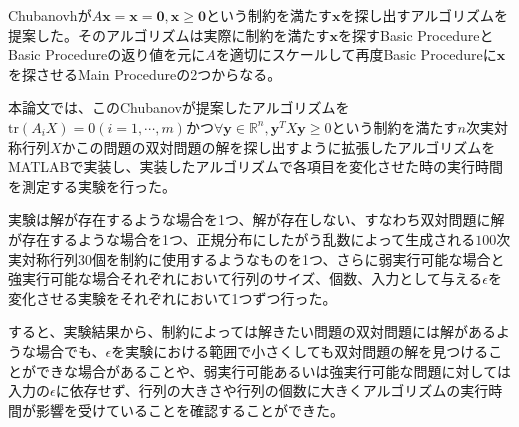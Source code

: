 \begin{概要}
  Chubanovhが$A\mathbf{x} = \mathbf{x} = \mathbf{0}, \mathbf{x} \geq \mathbf{0}$という制約を満たす$\mathbf{x}$を探し出すアルゴリズムを提案した。そのアルゴリズムは実際に制約を満たす$\mathbf{x}$を探すBasic ProcedureとBasic Procedureの返り値を元に$A$を適切にスケールして再度Basic Procedureに$\mathbf{x}$を探させるMain Procedureの2つからなる。

  本論文では、このChubanovが提案したアルゴリズムを$\mathrm{tr} \left(A_i X\right) = 0 \left(i = 1, \cdots, m\right)$かつ$\forall \mathbf{y} \in \mathbb{R}^n, \mathbf{y}^T X \mathbf{y} \geq 0$という制約を満たす$n$次実対称行列$X$かこの問題の双対問題の解を探し出すように拡張したアルゴリズムをMATLABで実装し、実装したアルゴリズムで各項目を変化させた時の実行時間を測定する実験を行った。

  実験は解が存在するような場合を1つ、解が存在しない、すなわち双対問題に解が存在するような場合を1つ、正規分布にしたがう乱数によって生成される$100$次実対称行列$30$個を制約に使用するようなものを1つ、さらに弱実行可能な場合と強実行可能な場合それぞれにおいて行列のサイズ、個数、入力として与える$\epsilon$を変化させる実験をそれぞれにおいて1つずつ行った。

  すると、実験結果から、制約によっては解きたい問題の双対問題には解があるような場合でも、$\epsilon$を実験における範囲で小さくしても双対問題の解を見つけることができな場合があることや、弱実行可能あるいは強実行可能な問題に対しては入力の$\epsilon$に依存せず、行列の大きさや行列の個数に大きくアルゴリズムの実行時間が影響を受けていることを確認することができた。
\end{概要}
\writeall

